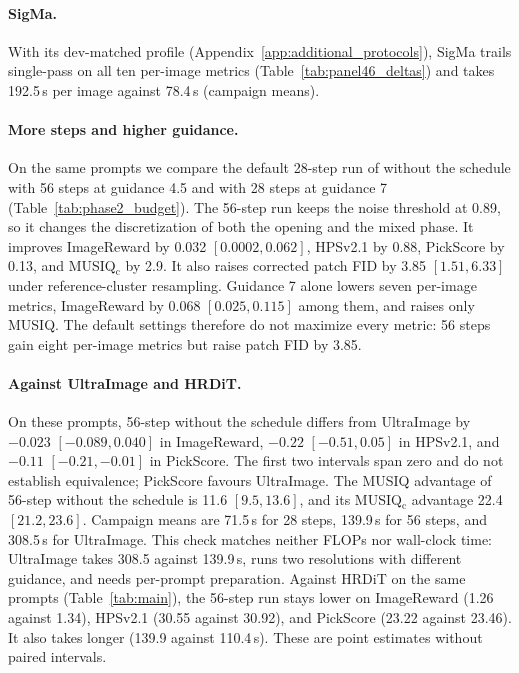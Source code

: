 
\apxqualitytime

\paragraph{SigMa.} With its dev-matched profile (Appendix~\ref{app:additional_protocols}), SigMa trails single-pass \sca{} on all ten per-image metrics (Table~\ref{tab:panel46_deltas}) and takes 192.5\,s per image against 78.4\,s (campaign means).

\paragraph{More steps and higher guidance.} On the same \npanel{} prompts we compare the default 28-step run of \sca{} without the schedule with 56 steps at guidance 4.5 and with 28 steps at guidance 7 (Table~\ref{tab:phase2_budget}). The 56-step run keeps the noise threshold at 0.89, so it changes the discretization of both the opening and the mixed phase. It improves ImageReward by 0.032 $[0.0002,0.062]$, HPSv2.1 by 0.88, PickScore by 0.13, and MUSIQ$_\text{c}$ by 2.9. It also raises corrected patch FID by 3.85 $[1.51,6.33]$ under reference-cluster resampling. Guidance 7 alone lowers seven per-image metrics, ImageReward by 0.068 $[0.025,0.115]$ among them, and raises only MUSIQ. The default settings therefore do not maximize every metric: 56 steps gain eight per-image metrics but raise patch FID by 3.85.

\paragraph{Against UltraImage and HRDiT.} On these \npanel{} prompts, 56-step \sca{} without the schedule differs from UltraImage by $-0.023$ $[-0.089,0.040]$ in ImageReward, $-0.22$ $[-0.51,0.05]$ in HPSv2.1, and $-0.11$ $[-0.21,-0.01]$ in PickScore. The first two intervals span zero and do not establish equivalence; PickScore favours UltraImage. The MUSIQ advantage of 56-step \sca{} without the schedule is 11.6 $[9.5,13.6]$, and its MUSIQ$_\text{c}$ advantage 22.4 $[21.2,23.6]$. Campaign means are 71.5\,s for 28 steps, 139.9\,s for 56 steps, and 308.5\,s for UltraImage. This check matches neither FLOPs nor wall-clock time: UltraImage takes 308.5 against 139.9\,s, runs two resolutions with different guidance, and needs per-prompt preparation. Against HRDiT on the same prompts (Table~\ref{tab:main}), the 56-step run stays lower on ImageReward (1.26 against 1.34), HPSv2.1 (30.55 against 30.92), and PickScore (23.22 against 23.46). It also takes longer (139.9 against 110.4\,s). These are point estimates without paired intervals.

